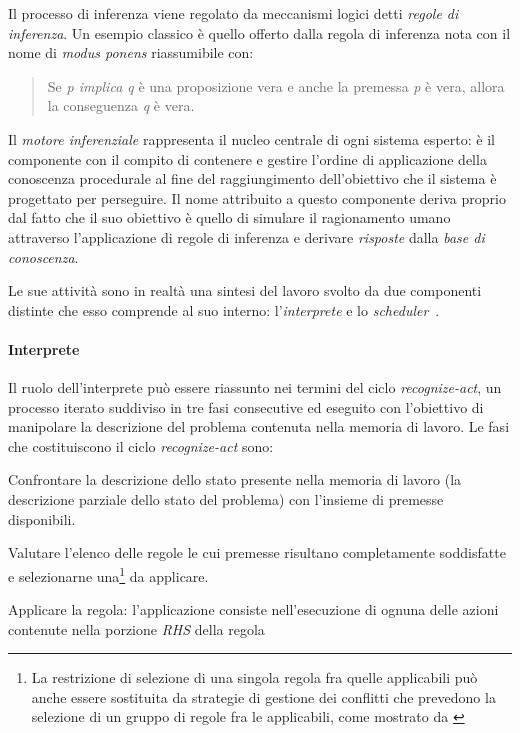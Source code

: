 Il processo di inferenza viene regolato da meccanismi logici detti \emph{regole di inferenza}. Un esempio classico è quello offerto dalla regola di inferenza nota con il nome di \emph{modus ponens} riassumibile con: \begin{quote}
Se \emph{p implica q} è una proposizione vera e anche la premessa \emph{p} è vera, allora la conseguenza \emph{q} è vera.
\end{quote}

Il \emph{motore inferenziale} rappresenta il nucleo centrale di ogni sistema esperto: è il componente con il compito di contenere e gestire l'ordine di applicazione della conoscenza procedurale al fine del raggiungimento dell'obiettivo che il sistema è progettato per perseguire. Il nome attribuito a questo componente deriva proprio dal fatto che il suo obiettivo è quello di simulare il ragionamento umano attraverso l'applicazione di regole di inferenza e derivare \emph{risposte} dalla \emph{base di conoscenza}.

Le sue attività sono in realtà una sintesi del lavoro svolto da due componenti distinte che esso comprende al suo interno: l'\emph{interprete} e lo \emph{scheduler}~\cite{development1993}.

\paragraph{Interprete} Il ruolo dell'interprete può essere riassunto nei termini del ciclo \emph{recognize-act}, un processo iterato suddiviso in tre fasi consecutive ed eseguito con l'obiettivo di manipolare la descrizione del problema contenuta nella memoria di lavoro. Le fasi che costituiscono il ciclo \emph{recognize-act} sono:
\begin{list}{}{}
	\item[(1)] Confrontare la descrizione dello stato presente nella memoria di lavoro (la descrizione parziale dello stato del problema) con l'insieme di premesse disponibili.
	\item[(2)] Valutare l'elenco delle regole le cui premesse risultano completamente soddisfatte e selezionarne una\footnote{La restrizione di selezione di una singola regola fra quelle applicabili può anche essere sostituita da strategie di gestione dei conflitti che prevedono la selezione di un gruppo di regole fra le applicabili, come mostrato da \cite{Doorenbos95productionmatching}} da applicare.
	\item[(3)] Applicare la regola: l'applicazione consiste nell'esecuzione di ognuna delle azioni contenute nella porzione \emph{RHS} della regola
\end{list}

